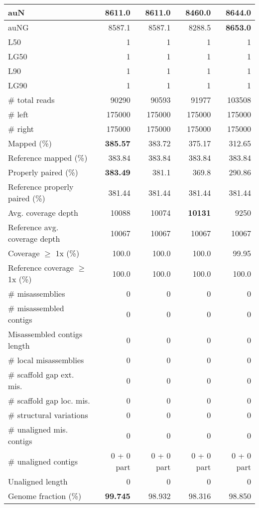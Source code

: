 \documentclass[12pt,a4paper]{article}
\begin{document}
\begin{table}[ht]
\begin{center}
\begin{tabular}{|l*{4}{|r}|}
auN & 8611.0 & 8611.0 & 8460.0 & {\bf 8644.0} \\ \hline
auNG & 8587.1 & 8587.1 & 8288.5 & {\bf 8653.0} \\ \hline
L50 & 1 & 1 & 1 & 1 \\ \hline
LG50 & 1 & 1 & 1 & 1 \\ \hline
L90 & 1 & 1 & 1 & 1 \\ \hline
LG90 & 1 & 1 & 1 & 1 \\ \hline
\# total reads & 90290 & 90593 & 91977 & 103508 \\ \hline
\# left & 175000 & 175000 & 175000 & 175000 \\ \hline
\# right & 175000 & 175000 & 175000 & 175000 \\ \hline
Mapped (\%) & {\bf 385.57} & 383.72 & 375.17 & 312.65 \\ \hline
Reference mapped (\%) & 383.84 & 383.84 & 383.84 & 383.84 \\ \hline
Properly paired (\%) & {\bf 383.49} & 381.1 & 369.8 & 290.86 \\ \hline
Reference properly paired (\%) & 381.44 & 381.44 & 381.44 & 381.44 \\ \hline
Avg. coverage depth & 10088 & 10074 & {\bf 10131} & 9250 \\ \hline
Reference avg. coverage depth & 10067 & 10067 & 10067 & 10067 \\ \hline
Coverage $\geq$ 1x (\%) & 100.0 & 100.0 & 100.0 & 99.95 \\ \hline
Reference coverage $\geq$ 1x (\%) & 100.0 & 100.0 & 100.0 & 100.0 \\ \hline
\# misassemblies & 0 & 0 & 0 & 0 \\ \hline
\# misassembled contigs & 0 & 0 & 0 & 0 \\ \hline
Misassembled contigs length & 0 & 0 & 0 & 0 \\ \hline
\# local misassemblies & 0 & 0 & 0 & 0 \\ \hline
\# scaffold gap ext. mis. & 0 & 0 & 0 & 0 \\ \hline
\# scaffold gap loc. mis. & 0 & 0 & 0 & 0 \\ \hline
\# structural variations & 0 & 0 & 0 & 0 \\ \hline
\# unaligned mis. contigs & 0 & 0 & 0 & 0 \\ \hline
\# unaligned contigs & 0 + 0 part & 0 + 0 part & 0 + 0 part & 0 + 0 part \\ \hline
Unaligned length & 0 & 0 & 0 & 0 \\ \hline
Genome fraction (\%) & {\bf 99.745} & 98.932 & 98.316 & 98.850 \\ \hline

\end{tabular}
\end{center}
\end{table}
\end{document}
